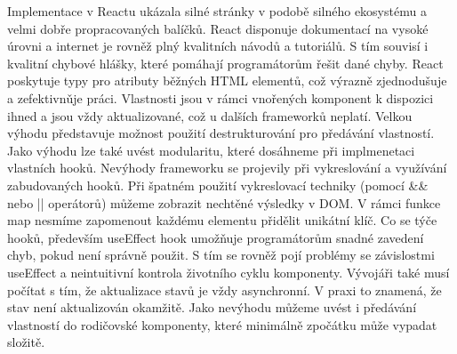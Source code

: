 Implementace v Reactu ukázala silné stránky v podobě silného ekosystému a velmi dobře propracovaných balíčků. 
React disponuje dokumentací na vysoké úrovni a internet je rovněž plný kvalitních návodů a tutoriálů. 
S tím souvisí i kvalitní chybové hlášky, které pomáhají programátorům řešit dané chyby. 
React poskytuje typy pro atributy běžných HTML elementů, což výrazně zjednodušuje a zefektivnǔje práci. 
Vlastnosti jsou v rámci vnořených komponent k dispozici ihned a jsou vždy aktualizované, což u dalších frameworků neplatí. 
Velkou výhodu představuje možnost použití destrukturování pro předávání vlastností. 
Jako výhodu lze také uvést modularitu, které dosáhneme při implmenetaci vlastních hooků. 
Nevýhody frameworku se projevily při vykreslování a využívání zabudovaných hooků. 
Při špatném použití vykreslovací techniky (pomocí \&\& nebo || operátorů) můžeme zobrazit nechtěné výsledky v DOM. 
V rámci funkce map nesmíme zapomenout každému elementu přidělit unikátní klíč. 
Co se týče hooků, především useEffect hook umožňuje programátorům snadné zavedení chyb, pokud není správně použit. 
S tím se rovněž pojí problémy se závislostmi useEffect a neintuitivní kontrola životního cyklu komponenty. 
Vývojáři také musí počítat s tím, že aktualizace stavů je vždy asynchronní. V praxi to znamená, že stav není aktualizován okamžitě. 
Jako nevýhodu můžeme uvést i předávání vlastností do rodičovské komponenty, které minimálně zpočátku může vypadat složitě.



